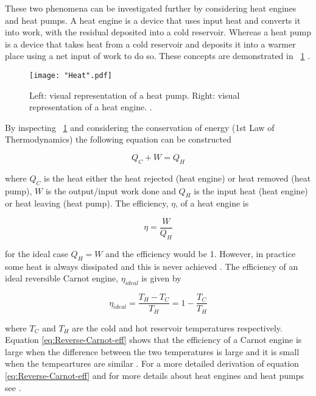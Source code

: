 \documentclass{article}
\newcommand{\figref}[2][\figurename~]{#1\ref{#2}}
\begin{document}
\vspace{2mm}
\noindent
These two phenomena can be investigated further by considering heat engines and heat pumps. A heat engine is a device that uses input heat and converts it into work, with the residual deposited into a cold reservoir. Whereas a heat pump is a device that takes heat from a cold reservoir and deposits it into a warmer place using a net input of work to do so. These concepts are demonstrated in \figref{fig:Heat} \cite{Paper02}.

\begin{figure}[h]
\centering
\texttt{[image: "Heat".pdf]}
\caption{Left: visual representation of a heat pump. Right: visual representation of a heat engine. \cite{Paper02}.}
\label{fig:Heat}
\end{figure}

\newpage
\vspace{2mm}
\noindent
By inspecting \figref{fig:Heat} and considering the conservation of energy (1st Law of Thermodynamics) \cite{Paper02} the following equation can be constructed

\begin{equation}
\label{eq:Energy-Conservation}
Q_C + W = Q_H
\end{equation}

\vspace{2mm}
\noindent
where $Q_C$ is the heat either the heat rejected (heat engine) or heat removed (heat pump), $W$ is the output/input work done and $Q_H$ is the input heat (heat engine) or heat leaving (heat pump). The efficiency, $\eta$, of a heat engine is

\begin{equation}
\label{eq:Heat-eff}
\eta = \frac{W}{Q_H}
\end{equation}

\vspace{2mm}
\noindent
for the ideal case $Q_H = W$ and the efficiency would be 1. However, in practice some heat is always dissipated and this is never achieved \cite{Book02}. The efficiency of an ideal reversible Carnot engine, $\eta_{ideal}$ is given by

\begin{equation}
\label{eq:Reverse-Carnot-eff}
\eta_{ideal} = \frac{T_H - T_C}{T_H} = 1 - \frac{T_C}{T_H}
\end{equation}

\vspace{2mm}
\noindent
where $T_C$ and $T_H$ are the cold and hot reservoir temperatures respectively. Equation \eqref{eq:Reverse-Carnot-eff} shows that the efficiency of a Carnot engine is large when the difference between the two temperatures is large and it is small when the tempeartures are similar \cite{Book02}. For a more detailed derivation of equation \eqref{eq:Reverse-Carnot-eff} and for more details about heat engines and heat pumps see \cite{Book02}.
\end{document}
